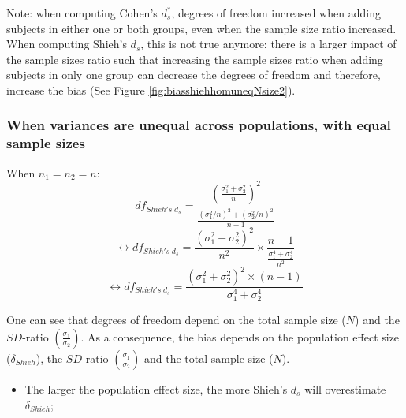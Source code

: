 \documentclass[
  english,
  man,mask]{apa6}
\providecommand{\tightlist}{%
  \setlength{\itemsep}{0pt}\setlength{\parskip}{0pt}}
\begin{document}
Note: when computing Cohen's \(d^*_s\), degrees of freedom increased when adding subjects in either one or both groups, even when the sample size ratio increased. When computing Shieh's \(d_s\), this is not true anymore: there is a larger impact of the sample sizes ratio such that increasing the sample sizes ratio when adding subjects in only one group can decrease the degrees of freedom and therefore, increase the bias (See Figure \ref{fig:biasshiehhomuneqNsize2}).

\hypertarget{when-variances-are-unequal-across-populations-with-equal-sample-sizes-1}{%
\subsubsection{When variances are unequal across populations, with equal sample sizes}\label{when-variances-are-unequal-across-populations-with-equal-sample-sizes-1}}

When \(n_1=n_2=n\):
\[df_{Shieh's \; d_s} = \frac{\left( \frac{\sigma_1^2+\sigma_2^2}{n} \right)^2}{\frac{(\sigma_1^2/n)^2+(\sigma_2^2/n)^2}{n-1}}\]
\[\leftrightarrow df_{Shieh's \; d_s} = \frac{(\sigma_1^2+\sigma_2^2)^2}{n^2} \times\frac{n-1}{\frac{\sigma_1^4+\sigma_2^4}{n^2}}\]
\[\leftrightarrow df_{Shieh's \; d_s} = \frac{(\sigma_1^2+\sigma_2^2)^2 \times (n-1)}{\sigma_1^4+\sigma_2^4}\]

One can see that degrees of freedom depend on the total sample size (\(N\)) and the \(SD\)-ratio \(\left( \frac{\sigma_1}{\sigma_2}\right)\). As a consequence, the bias depends on the population effect size (\(\delta_{Shieh}\)), the \(SD\)-ratio \(\left( \frac{\sigma_1}{\sigma_2}\right)\) and the total sample size (\(N\)).

\begin{itemize}
\tightlist
\item
  The larger the population effect size, the more Shieh's \(d_s\) will overestimate \(\delta_{Shieh}\);
\end{itemize}
\end{document}
